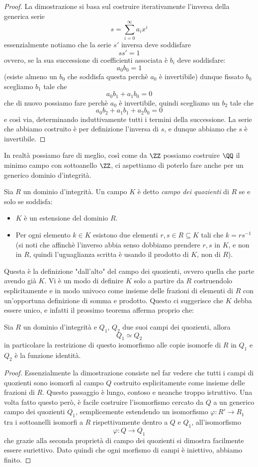 \documentclass[11pt]{scrartcl}
\begin{document}
	\begin{proof}
		La dimostrazione si basa sul costruire iterativamente l'inversa della generica serie
		$$s=\sum_{i=0}^{\infty}a_ix^i$$
		essenzialmente notiamo che la serie $s'$ inversa deve soddisfare
		$$ss'=1$$
		ovvero, se la sua successione di coefficienti associata è $b_i$ deve soddisfare:
		$$a_0b_0=1$$
		(esiste almeno un $b_0$ che soddisfa questa perchè $a_0$ è invertibile) dunque fissato $b_0$ scegliamo $b_1$ tale che 
		$$a_0b_1+a_1b_0=0$$
		che di nuovo possiamo fare perchè $a_0$ è invertibile, quindi scegliamo un $b_2$ tale che 
		$$a_0b_2+a_1b_1+a_2b_0=0$$
		e così via, determinando induttivamente tutti i termini della successione. La serie che abbiamo costruito è per definizione l'inversa di $s$, e dunque abbiamo che $s$ è invertibile.
	\end{proof}
	In realtà possiamo fare di meglio, così come da $\ZZ$ possiamo costruire $\QQ$ il minimo campo con sottoanello $\ZZ$, ci aspettiamo di poterlo fare anche per un generico dominio d'integrità. 
	\begin{definition}
		Sia $R$ un dominio d'integrità. Un campo $K$ è detto \textit{campo dei quozienti} di $R$ se e solo se soddisfa:
		\begin{itemize}
			\item$K$ è un estensione del dominio $R$.
			\item Per ogni elemento $k\in K$ esistono due elementi $r,s\in R\subseteq K$ tali che $k=rs^{-1}$ (si noti che affinchè l'inverso abbia senso dobbiamo prendere $r,s$ in $K$, e non in $R$, quindi l'uguaglianza scritta è usando il prodotto di $K$, non di $R$).
		\end{itemize}
	\end{definition}
	Questa è la definizione "dall'alto" del campo dei quozienti, ovvero quella che parte avendo già $K$. Vi è un modo di definire $K$ solo a partire da $R$ costruendolo esplicitamente e in modo univoco come insieme delle frazioni di elementi di $R$ con un'opportuna definizione di somma e prodotto. Questo ci suggerisce che $K$ debba essere unico, e infatti il prossimo teorema afferma proprio che:
	\begin{theorem}
		Sia $R$ un dominio d'integrità e $Q_1$, $Q_2$ due suoi campi dei quozienti, allora 
		$$Q_1\simeq Q_2$$
		in particolare la restrizione di questo isomorfismo alle copie isomorfe di $R$ in $Q_1$ e $Q_2$ è la funzione identità.
	\end{theorem}
	\begin{proof}
		Essenzialmente la dimostrazione consiste nel far vedere che tutti i campi di quozienti sono isomorfi al campo $Q$ costruito esplicitamente come insieme delle frazioni di $R$. Questo passaggio è lungo, contoso e neanche troppo istruttivo. Una volta fatto questo però, è facile costruire l'isomorfismo cercato da $Q$ a un generico campo dei quozienti $Q_1$, semplicemente estendendo un isomorfismo $\varphi:R'\to R_1$ tra i sottoanelli isomorfi a $R$ rispettivamente dentro a $Q$ e $Q_1$, all'isomorfismo 
		$$\varphi:Q\to Q_1$$ 
		che grazie alla seconda proprietà di campo dei quozienti si dimostra facilmente essere suriettivo. Dato quindi che ogni morfismo di campi è iniettivo, abbiamo finito.
	\end{proof}
\end{document}
